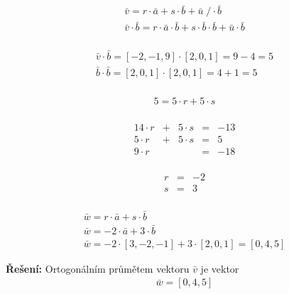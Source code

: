 \begin{displaymath}
\begin{matrix}
\bar{v} = r\cdot\bar{a}+s\cdot\bar{b} + \bar{u} \; / \cdot \bar{b}\\
\bar{v}\cdot\bar{b} = r\cdot\bar{a}\cdot\bar{b} + s\cdot\bar{b}\cdot\bar{b} + \bar{u}\cdot\bar{b}\\
\end{matrix}
\end{displaymath}

\begin{displaymath}
\begin{matrix}
\bar{v}\cdot\bar{b} = [\minus2,\minus1,9]\cdot[2,0,1]=9\minus4=5\\
\bar{b}\cdot\bar{b} = [2,0,1]\cdot[2,0,1]=4+1=5\\
\end{matrix}
\end{displaymath}

\begin{displaymath}
\begin{matrix}
5=5\cdot r+5\cdot s\\
\end{matrix}
\end{displaymath}

\begin{displaymath}
\begin{matrix}
14\cdot r & + & 5\cdot s & = & -13\\
5\cdot r & + & 5\cdot s & = & 5 \\
\hline
9\cdot r & & & = & -18\\
\end{matrix}
\end{displaymath}

\begin{displaymath}
\begin{matrix}
r & = & -2\\
s & = & 3\\
\end{matrix}
\end{displaymath}

\begin{displaymath}
\begin{matrix}
\bar{w} = r\cdot\bar{a}+s\cdot\bar{b} \\ 
\bar{w} = -2\cdot\bar{a} +  3\cdot\bar{b} \\
\bar{w} = -2\cdot[3,\minus2,\minus1] +  3\cdot[2,0,1] = [0,4,5]
\end{matrix}
\end{displaymath}

\textbf{Řešení:} Ortogonálním průmětem vektoru $\bar{v}$ je vektor
\begin{displaymath}
\begin{matrix}
\bar{w} = [0,4,5]
\end{matrix}
\end{displaymath}